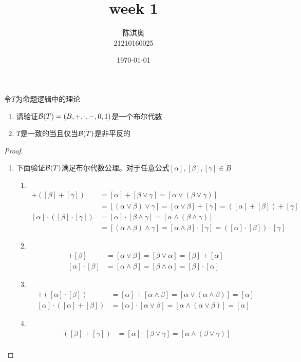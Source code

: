 \documentclass[11pt]{article}
\author{陈淇奥\\21210160025}
\date{\today}
\title{week 1}
\begin{document}
\maketitle
\begin{exercise}[1.1.5]
令\(T\)为命题逻辑中的理论
\begin{enumerate}
\item 请验证\(\mathcal{B}(T)=(B,+,\cdot,-,0,1)\)是一个布尔代数
\item \(T\)是一致的当且仅当\(\mathcal{B}(T)\)是非平反的
\end{enumerate}
\end{exercise}

\begin{proof}
\begin{enumerate}
\item 下面验证\(\mathcal{B}(T)\)满足布尔代数公理。对于任意公式\([\alpha],[\beta],[\gamma]\in B\)
\begin{enumerate}
\item ​
\begin{align*}
[\alpha]+([\beta]+[\gamma])&=[\alpha]+[\beta\vee\gamma]=[\alpha\vee(\beta\vee\gamma)]\\
&=[(\alpha\vee\beta)\vee\gamma]=[\alpha\vee\beta]+[\gamma]=([\alpha]+[\beta])+[\gamma]\\
[\alpha]\cdot([\beta]\cdot[\gamma])&=[\alpha]\cdot[\beta\wedge\gamma]=[\alpha\wedge(\beta\wedge\gamma)]\\
&=[(\alpha\wedge\beta)\wedge\gamma]=[\alpha\wedge\beta]\cdot[\gamma]=([\alpha]\cdot[\beta])\cdot[\gamma]
\end{align*}
\item ​
\begin{align*}
[\alpha]+[\beta]&=[\alpha\vee\beta]=[\beta\vee\alpha]=[\beta]+[\alpha]\\
[\alpha]\cdot[\beta]&=[\alpha\wedge\beta]=[\beta\wedge\alpha]=[\beta]\cdot[\alpha]
\end{align*}
\item ​
\begin{align*}
[\alpha]+([\alpha]\cdot[\beta])&=[\alpha]+[\alpha\wedge\beta]=[\alpha\vee(\alpha\wedge\beta)]=[\alpha]\\
[\alpha]\cdot([\alpha]+[\beta])&=[\alpha]\cdot[\alpha\vee\beta]=[\alpha\wedge(\alpha\vee\beta)]=[\alpha]
\end{align*}
\item ​
\begin{align*}
 [\alpha]\cdot([\beta]+[\gamma])&=[\alpha]\cdot[\beta\vee\gamma]=[\alpha\wedge(\beta\vee\gamma)]\\

\end{align*}
\end{enumerate}
\end{enumerate}
\end{proof}
\end{document}
